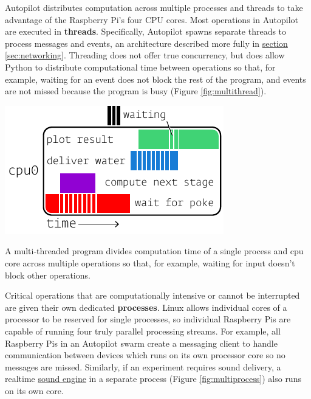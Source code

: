 Autopilot distributes computation across multiple processes and threads to take advantage of the Raspberry Pi's four CPU cores. Most operations in Autopilot are executed in \textbf{threads}. Specifically, Autopilot spawns separate threads to process messages and events, an architecture described more fully in \hyperref[sec:networking]{section \ref*{sec:networking}}. Threading does not offer true concurrency, but does allow Python to distribute computational time between operations so that, for example, waiting for an event does not block the rest of the program, and events are not missed because the program is busy (Figure \ref{fig:multithread}).

\begin{marginfigure}[0.25cm]
\includegraphics[]{figures/side_13_multithread.pdf}
\caption{A multi-threaded program divides computation time of a single process and cpu core across multiple operations so that, for example, waiting for input doesn't block other operations.}
\label{fig:multithread}
\end{marginfigure}

Critical operations that are computationally intensive or cannot be interrupted are given their own dedicated \textbf{processes}. Linux allows individual cores of a processor to be reserved for single processes, so individual Raspberry Pis are capable of running four truly parallel processing streams. For example, all Raspberry Pis in an Autopilot swarm create a messaging client to handle communication between devices which runs on its own processor core so no messages are missed. Similarly, if an experiment requires sound delivery, a realtime \hyperref[sec:stim]{sound engine} in a separate process (Figure \ref{fig:multiprocess}) also runs on its own core.

